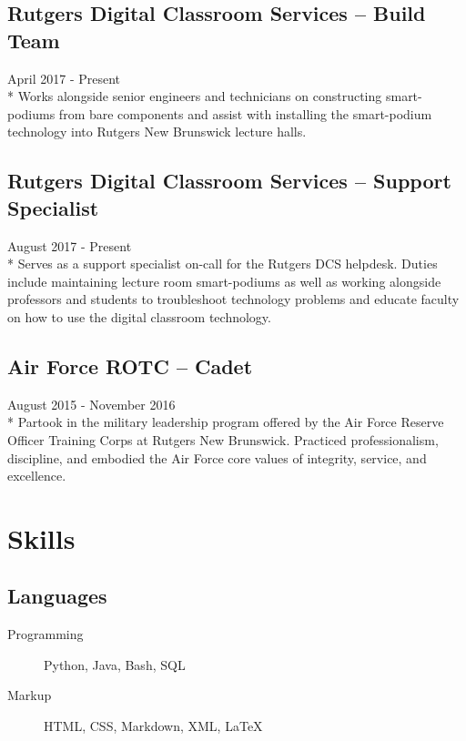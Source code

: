 \documentclass{article}
\begin{document}
\begin{samepage}
\subsection{Rutgers Digital Classroom Services -- Build Team}
April 2017 - Present\\*
Works alongside senior engineers and technicians on constructing smart-podiums from bare components and assist with installing the smart-podium technology into Rutgers New Brunswick lecture halls.

\subsection{Rutgers Digital Classroom Services -- Support Specialist}
August 2017 - Present\\*
Serves as a support specialist on-call for the Rutgers DCS helpdesk. Duties include maintaining lecture room smart-podiums as well as working alongside professors and students to troubleshoot technology problems and educate faculty on how to use the digital classroom technology.

\subsection{Air Force ROTC -- Cadet}
August 2015 - November 2016\\*
Partook in the military leadership program offered by the Air Force Reserve Officer Training Corps at Rutgers New Brunswick. Practiced professionalism, discipline, and embodied the Air Force core values of integrity, service, and excellence.

\section{Skills}

\iffalse
\subsection{Soft Skills}
Technical Writing/Documentation Writing, Router Configuration, Server Administration, Raspberry Pi, Arduino
\fi

\subsection{Languages}
\begin{description}
\item[Programming] Python, Java, Bash, SQL
\item[Markup] HTML, CSS, Markdown, XML, {\LaTeX}
\end{description}


\end{samepage}
\end{document}
